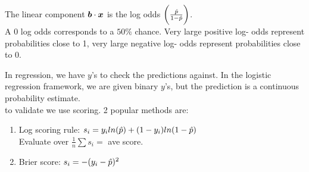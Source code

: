 \documentclass[12pt]{article}
\begin{document}
\begin{enumerate}
The linear component $\boldsymbol{b} \cdot \boldsymbol{x}$ is the log odds $\bigg( \frac{\hat{p}}{1 - \hat{p}} \bigg)$. \\
A 0 log odds corresponds to a $50\%$ chance. Very large positive log- odds represent probabilities close to 1, very large negative log- odds represent probabilities close to 0. 


In regression, we have $y$'s to check the predictions against. In the logistic regression framework, we are given binary $y$'s, but the prediction is a continuous probability estimate. \\
to validate we use scoring. 2 popular methods are:
\begin{enumerate}[1.]
\item Log scoring rule: $s_i = y_i ln(\hat{p} ) + (1 - y_i) ln(1 - \hat{p})$\\
Evaluate over $\frac{1}{n} \sum s_i = $ ave score. 
\item Brier score: $s_i = -(y_i - \hat{p})^2 $
\end{enumerate}

\end{enumerate}


\end{document}
